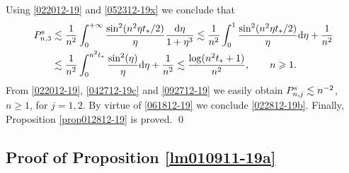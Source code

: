 \documentclass[EJP]{ejpecp} %
\renewcommand{\ge}{\geqslant}
\newcommand{\dd  }{\mathrm{d}}
\numberwithin{equation}{section}
\begin{document}
Using \eqref{022012-19} and \eqref{052312-19x} we conclude that
\begin{align}
  \label{061812-19abis}
P^{\rm s}_{n,3}
& \lesssim \frac{1}{n^2}\int_{0}^{+\infty}\frac{\sin^2(n^2\eta
  t_*/2)}{\eta} \frac{\dd\eta}{1+\eta^{3}}\lesssim  \frac{1}{n^2}\int_{0}^{1}\frac{\sin^2(n^2\eta
  t_*/2)}{\eta}\dd\eta+\frac{1}{n^2}\\
&
  \lesssim \frac{1}{n^2}\int_{0}^{n^2t_*}\frac{\sin^2(\eta
  )}{\eta}\dd\eta +\frac{1}{n^2}\lesssim \frac{\log(n^2 t_*+1)}{n^2},\qquad n\ge1.\notag
 \end{align} 
From  \eqref{022012-19}, \eqref{042712-19c} and \eqref{092712-19} we easily obtain
$
P^{\rm s}_{n,j}
\lesssim n^{-2}$, $n\ge1$, for $j=1,2$.
 By virtue of \eqref{061812-19} we  conclude \eqref{022812-19b}. Finally, Proposition \ref{prop012812-19} is proved. \qed









\subsection{Proof of Proposition \ref{lm010911-19a}}

\label{sec8}
\end{document}
